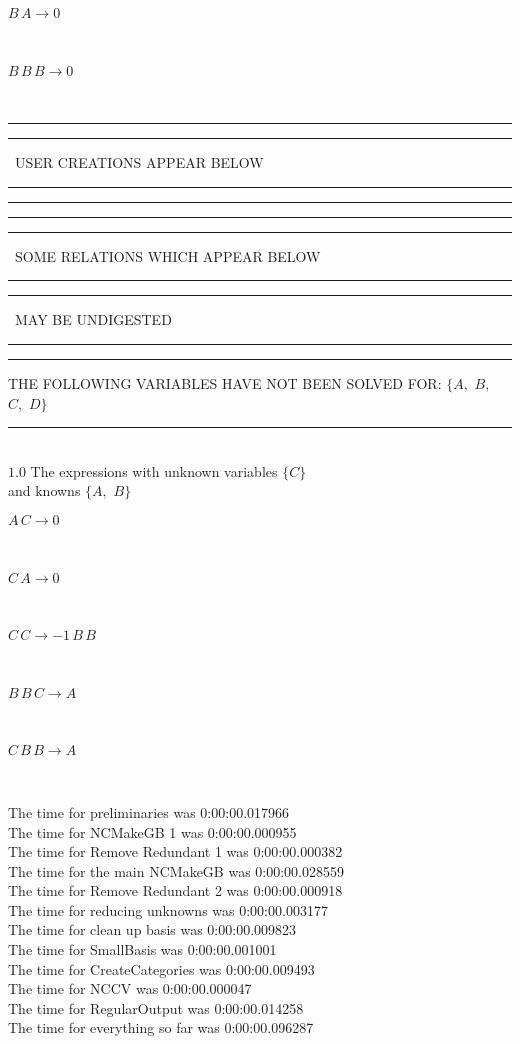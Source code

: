 \documentclass[rep10,leqno]{report}
\begin{document}
\begin{minipage}{6in}
$
B\,
 A\rightarrow 0
$
\end{minipage}\medskip \\
\begin{minipage}{6in}
$
B\,
 B\,
 B\rightarrow 0
$
\end{minipage}\\
\rule[2pt]{6in}{1pt}\hfil\break
\rule[2.5pt]{1.701in}{1pt}
\ USER CREATIONS APPEAR BELOW\ 
\rule[2.5pt]{1.701in}{1pt}\hfil\break
\rule[2pt]{6in}{1pt}\hfil\break
\rule[2pt]{6in}{4pt}\hfil\break
\rule[2pt]{1.45in}{4pt}
\ SOME RELATIONS WHICH APPEAR BELOW\ 
\rule[2pt]{1.45in}{4pt}\hfil\break
\rule[2pt]{2.18in}{4pt}
\ MAY BE UNDIGESTED\ 
\rule[2pt]{2.18in}{4pt}\hfil\break
\rule[2pt]{6in}{4pt}\hfil\break
THE FOLLOWING VARIABLES HAVE NOT BEEN SOLVED FOR:\hfil\break
$\{A,
$ $
B,
$ $
C,
$ $
D\}$
\smallskip\\
\rule[3pt]{6in}{.7pt}\\
$1.0$  The expressions with unknown variables $\{C\}$\\
and knowns $\{A,
$ $
B\}$\smallskip\\
\begin{minipage}{6in}
$
A\,
 C\rightarrow 0
$
\end{minipage}\medskip \\
\begin{minipage}{6in}
$
C\,
 A\rightarrow 0
$
\end{minipage}\medskip \\
\begin{minipage}{6in}
$
C\,
 C\rightarrow -1\,
 B\,
 B
$
\end{minipage}\medskip \\
\begin{minipage}{6in}
$
B\,
 B\,
 C\rightarrow A
$
\end{minipage}\medskip \\
\begin{minipage}{6in}
$
C\,
 B\,
 B\rightarrow A
$
\end{minipage}\\
\vspace{10pt}

\noindent
The time for preliminaries was 0:00:00.017966\\
The time for NCMakeGB 1 was 0:00:00.000955\\
The time for Remove Redundant 1 was 0:00:00.000382\\
The time for the main NCMakeGB was 0:00:00.028559\\
The time for Remove Redundant 2 was 0:00:00.000918\\
The time for reducing unknowns was 0:00:00.003177\\
The time for clean up basis was 0:00:00.009823\\
The time for SmallBasis was 0:00:00.001001\\
The time for CreateCategories was 0:00:00.009493\\
The time for NCCV was 0:00:00.000047\\
The time for RegularOutput was 0:00:00.014258\\
The time for everything so far was 0:00:00.096287\\
\end{document}
